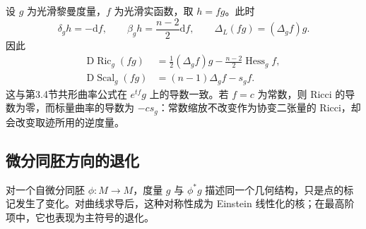 \begin{example}\label{g3:exm:ricci-conformal-linearization}
	设 \(g\) 为光滑黎曼度量，\(f\) 为光滑实函数，取 \(h=fg\)。此时
	\[
		\delta_gh=-\mathrm df,\qquad \beta_gh=\frac{n-2}{2}\mathrm df,\qquad \Delta_L(fg)=(\Delta_gf)g.
	\]
	因此
	\begin{align*}
		\mathrm D\operatorname{Ric}_g(fg)&=\frac12(\Delta_gf)g-\frac{n-2}{2}\operatorname{Hess}_gf,\\
		\mathrm D\operatorname{Scal}_g(fg)&=(n-1)\Delta_gf-s_gf.
	\end{align*}
	这与第3.4节共形曲率公式在 \(e^{tf}g\) 上的导数一致。若 \(f=c\) 为常数，则 Ricci 的导数为零，而标量曲率的导数为 \(-cs_g\)：常数缩放不改变作为协变二张量的 Ricci，却会改变取迹所用的逆度量。
\end{example}

\subsection{微分同胚方向的退化}
\label{g3:subsec:2501:03}
对一个自微分同胚 \(\phi:M\to M\)，度量 \(g\) 与 \(\phi^*g\) 描述同一个几何结构，只是点的标记发生了变化。对曲线求导后，这种对称性成为 Einstein 线性化的核；在最高阶项中，它也表现为主符号的退化。

